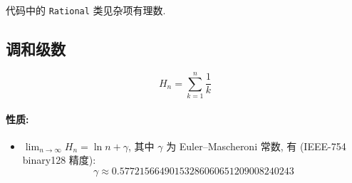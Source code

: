 代码中的 \lstinline{Rational} 类见杂项有理数.



\subsection{调和级数}
\[H_n=\sum_{k=1}^n\frac1k\]

\paragraph{性质:}
\begin{itemize}
  \item $\displaystyle\lim_{n\to\infty}H_n=\ln n+\gamma$, 其中 $\gamma$ 为 Euler–Mascheroni 常数, 有 (IEEE-754 binary128 精度): \[\gamma\approx0.57721566490153286060651209008240243\]
\end{itemize}
